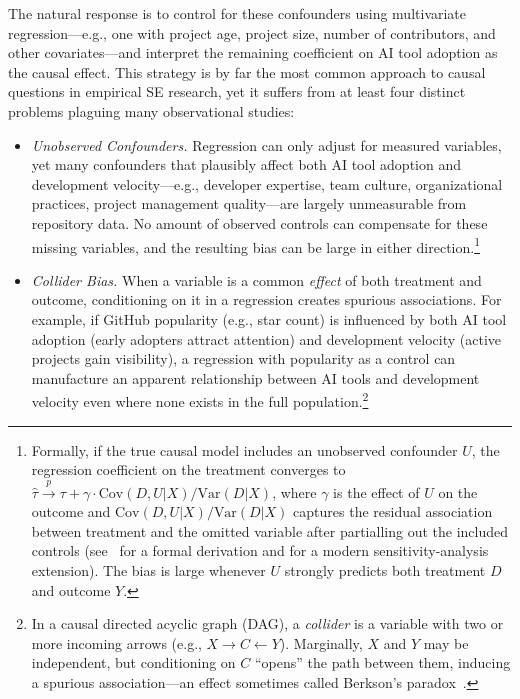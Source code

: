 The natural response is to control for these confounders using multivariate regression---e.g., one with project age, project size, number of contributors, and other covariates---and interpret the remaining coefficient on AI tool adoption as the causal effect.
This strategy is by far the most common approach to causal questions in empirical SE research, yet it suffers from at least four distinct problems plaguing many observational studies:
\begin{itemize}[leftmargin=15pt]
    \item \emph{Unobserved Confounders.}
    Regression can only adjust for measured variables, yet many confounders that plausibly affect both AI tool adoption and development velocity---e.g., developer expertise, team culture, organizational practices, project management quality---are largely unmeasurable from repository data.
    No amount of observed controls can compensate for these missing variables, and the resulting bias can be large in either direction.\footnote{Formally, if the true causal model includes an unobserved confounder $U$, the regression coefficient on the treatment converges to $\hat{\tau} \xrightarrow{p} \tau + \gamma \cdot \text{Cov}(D, U|X) / \text{Var}(D|X)$, where $\gamma$ is the effect of $U$ on the outcome and $\text{Cov}(D, U|X)/\text{Var}(D|X)$ captures the residual association between treatment and the omitted variable after partialling out the included controls (see~\citet[Ch.~3, \S3.2.2]{angrist2009mostly} for a formal derivation and \citet{cinelli2020making} for a modern sensitivity-analysis extension).
    The bias is large whenever $U$ strongly predicts both treatment $D$ and outcome $Y$.}
    \item \emph{Collider Bias.}
    When a variable is a common \emph{effect} of both treatment and outcome, conditioning on it in a regression creates spurious associations.
    For example, if GitHub popularity (e.g., star count) is influenced by both AI tool adoption (early adopters attract attention) and development velocity (active projects gain visibility), a regression with popularity as a control can manufacture an apparent relationship between AI tools and development velocity even where none exists in the full population.\footnote{In a causal directed acyclic graph (DAG), a \emph{collider} is a variable with two or more incoming arrows (e.g., $X \to C \leftarrow Y$).
    Marginally, $X$ and $Y$ may be independent, but conditioning on $C$ ``opens'' the path between them, inducing a spurious association---an effect sometimes called Berkson's paradox~\cite{berkson1946limitations}.
}
\end{itemize}
